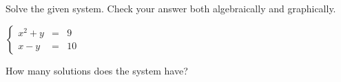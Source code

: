 \documentclass{ximera}
\author{Kenneth Berglund}
\begin{document}
Solve the given system. Check your answer both algebraically and graphically.

$\left\{ \begin{array}{rcr} x^2+y & = & 9  \\ x-y  & = & 10  \end{array} \right.$

\begin{exercise}
How many solutions does the system have?
\begin{multipleChoice}  
\end{multipleChoice}  
\end{exercise}
\end{document}
